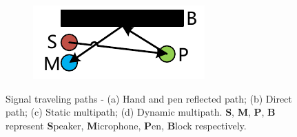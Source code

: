 \begin{figure}
\begin{subfigure}[b]{0.49\textwidth}
    \includegraphics[width=\textwidth]{figure/signal-path-dynamic-multipath}
    \caption{}
    \label{fig:signal-path-dynamic-multipath}
  \end{subfigure}
  {Signal traveling paths - (a) Hand and pen reflected path; (b) Direct path; (c) Static multipath; (d) Dynamic multipath. \textbf{S}, \textbf{M}, \textbf{P}, \textbf{B} represent \textbf{S}peaker, \textbf{M}icrophone, \textbf{P}en, \textbf{B}lock respectively.}
  \label{fig:signal-travel-paths}
\end{figure}


